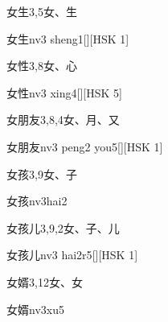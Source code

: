\begin{Entry}{女生}{3,5}{⼥、⽣}
  \begin{Phonetics}{女生}{nv3 sheng1}[][HSK 1]
  \end{Phonetics}
\end{Entry}

\begin{Entry}{女性}{3,8}{⼥、⼼}
  \begin{Phonetics}{女性}{nv3 xing4}[][HSK 5]
  \end{Phonetics}
\end{Entry}

\begin{Entry}{女朋友}{3,8,4}{⼥、⽉、⼜}
  \begin{Phonetics}{女朋友}{nv3 peng2 you5}[][HSK 1]
  \end{Phonetics}
\end{Entry}

\begin{Entry}{女孩}{3,9}{⼥、⼦}
  \begin{Phonetics}{女孩}{nv3hai2}
  \end{Phonetics}
\end{Entry}

\begin{Entry}{女孩儿}{3,9,2}{⼥、⼦、⼉}
  \begin{Phonetics}{女孩儿}{nv3 hai2r5}[][HSK 1]
  \end{Phonetics}
\end{Entry}

\begin{Entry}{女婿}{3,12}{⼥、⼥}
  \begin{Phonetics}{女婿}{nv3xu5}
  \end{Phonetics}
\end{Entry}

